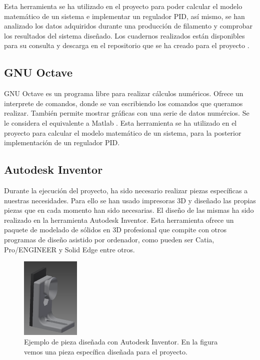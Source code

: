 Esta herramienta se ha utilizado en el proyecto para poder calcular el modelo matemático de un sistema e implementar un regulador PID, así mismo, se han analizado los datos adquiridos durante una producción de filamento y comprobar los resultados del sistema diseñado. Los cuadernos realizados están disponibles para su consulta y descarga en el repositorio que se ha creado para el proyecto \cite{githubTFG}.

\subsection{GNU Octave}
GNU Octave es un programa libre para realizar cálculos numéricos. Ofrece un interprete de comandos, donde se van escribiendo los comandos que queramos realizar. También permite mostrar gráficas con una serie de datos numércios. Se le considera el equivalente a Matlab \cite{octave}. Esta herramienta se ha utilizado en el proyecto para calcular el modelo matemático de un sistema, para la posterior implementación de un regulador PID.

\subsection{Autodesk Inventor}
Durante la ejecución del proyecto, ha sido necesario realizar piezas específicas a nuestras necesidades. Para ello se han usado impresoras 3D y diseñado las propias piezas que en cada momento han sido necesarias. El diseño de las mismas ha sido realizado en la herramienta Autodesk Inventor. Esta herramienta ofrece un paquete de modelado de sólidos en 3D profesional que compite con otros programas de diseño asistido por ordenador, como pueden ser Catia, Pro/ENGINEER y Solid Edge entre otros.

\begin{figure}[H]
    \centering
    \includegraphics[width=0.25\textwidth]{images/peletizadora/guia.png}
    \caption[Ejemplo de pieza diseñada con Autodesk Inventor.]{Ejemplo de pieza diseñada con Autodesk Inventor. En la figura vemos una pieza específica diseñada para el proyecto.}
    \label{fig:pieza}
\end{figure}

